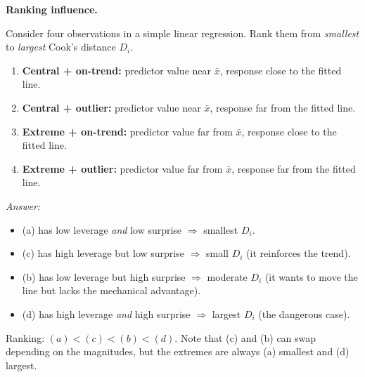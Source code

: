 \begin{stopandthink}
\textbf{Ranking influence.}

Consider four observations in a simple linear regression.
Rank them from \emph{smallest} to \emph{largest} Cook's distance $D_i$.
\begin{enumerate}[nosep, label=(\alph*)]
  \item \textbf{Central + on-trend:}
        predictor value near $\bar{x}$, response close to the fitted line.
  \item \textbf{Central + outlier:}
        predictor value near $\bar{x}$, response far from the fitted line.
  \item \textbf{Extreme + on-trend:}
        predictor value far from $\bar{x}$, response close to the fitted line.
  \item \textbf{Extreme + outlier:}
        predictor value far from $\bar{x}$, response far from the fitted line.
\end{enumerate}
\emph{Answer:}
\begin{itemize}[nosep]
  \item (a) has low leverage \emph{and} low surprise $\Rightarrow$ smallest $D_i$.
  \item (c) has high leverage but low surprise $\Rightarrow$ small $D_i$
        (it reinforces the trend).
  \item (b) has low leverage but high surprise $\Rightarrow$ moderate $D_i$
        (it wants to move the line but lacks the mechanical advantage).
  \item (d) has high leverage \emph{and} high surprise $\Rightarrow$ largest $D_i$
        (the dangerous case).
\end{itemize}
Ranking: $(a) < (c) < (b) < (d)$.
Note that (c) and (b) can swap depending on the magnitudes,
but the extremes are always (a) smallest and (d) largest.
\end{stopandthink}



